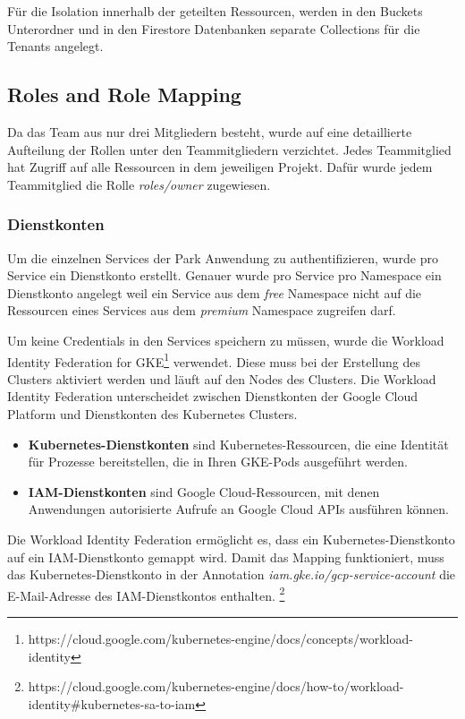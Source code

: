 Für die Isolation innerhalb der geteilten Ressourcen, werden in den Buckets Unterordner und in 
den Firestore Datenbanken separate Collections für die Tenants angelegt.

\subsection{Roles and Role Mapping}

Da das Team aus nur drei Mitgliedern besteht, wurde auf eine detaillierte Aufteilung der Rollen unter
den Teammitgliedern verzichtet. Jedes Teammitglied hat Zugriff auf alle Ressourcen in dem jeweiligen Projekt.
Dafür wurde jedem Teammitglied die Rolle \textit{roles/owner} zugewiesen.

\subsubsection{Dienstkonten}

Um die einzelnen Services der Park Anwendung zu authentifizieren, wurde pro Service ein Dienstkonto erstellt.
Genauer wurde pro Service pro Namespace ein Dienstkonto angelegt weil ein Service aus dem \textit{free}
Namespace nicht auf die Ressourcen eines Services aus dem \textit{premium} Namespace zugreifen darf.

Um keine Credentials in den Services speichern zu müssen, 
wurde die \glqq{}Workload Identity Federation for GKE\grqq{}\footnote{https://cloud.google.com/kubernetes-engine/docs/concepts/workload-identity} verwendet.
Diese muss bei der Erstellung des Clusters aktiviert werden und läuft auf den Nodes des Clusters. 
Die Workload Identity Federation unterscheidet zwischen Dienstkonten 
der Google Cloud Platform und Dienstkonten des Kubernetes Clusters.

\begin{itemize}
  \item \textbf{Kubernetes-Dienstkonten} sind Kubernetes-Ressourcen, die eine Identität für Prozesse bereitstellen, 
  die in Ihren GKE-Pods ausgeführt werden.
  \item \textbf{IAM-Dienstkonten} sind Google Cloud-Ressourcen, 
  mit denen Anwendungen autorisierte Aufrufe an Google Cloud APIs ausführen können.
\end{itemize}

Die Workload Identity Federation ermöglicht es, dass ein Kubernetes-Dienstkonto auf ein IAM-Dienstkonto gemappt wird.
Damit das Mapping funktioniert, muss das Kubernetes-Dienstkonto in der Annotation 
\textit{iam.gke.io/gcp-service-account} die E-Mail-Adresse des IAM-Dienstkontos enthalten.
\footnote{https://cloud.google.com/kubernetes-engine/docs/how-to/workload-identity\#kubernetes-sa-to-iam}


